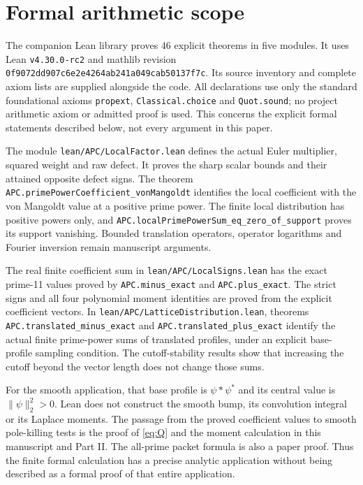 \documentclass[11pt,letterpaper]{article}
\theoremstyle{definition}
\theoremstyle{remark}
\begin{document}
\section{Formal arithmetic scope}

The companion Lean library \cite{APCcode} proves 46 explicit
theorems in five modules. It uses Lean \texttt{v4.30.0-rc2}
and mathlib revision
\nolinkurl{0f9072dd907c6e2e4264ab241a049cab50137f7c}.
Its source inventory and complete axiom lists are supplied
alongside the code. All declarations use only the standard
foundational axioms \texttt{propext}, \texttt{Classical.choice}
and \texttt{Quot.sound}; no project arithmetic axiom or admitted
proof is used. This concerns the explicit formal statements
described below, not every argument in this paper.

The module \nolinkurl{lean/APC/LocalFactor.lean} defines the
actual Euler multiplier, squared weight and raw defect.
It proves the sharp scalar bounds and their attained opposite
defect signs. The theorem
\nolinkurl{APC.primePowerCoefficient_vonMangoldt}
identifies the local coefficient with the von Mangoldt value
at a positive prime power. The finite local distribution has
positive powers only, and
\nolinkurl{APC.localPrimePowerSum_eq_zero_of_support}
proves its support vanishing. Bounded translation operators,
operator logarithms and Fourier inversion remain manuscript
arguments.

The real finite coefficient sum in
\nolinkurl{lean/APC/LocalSigns.lean} has the exact prime-11
values proved by \nolinkurl{APC.minus_exact} and
\nolinkurl{APC.plus_exact}. The strict signs and all four
polynomial moment identities are proved from the explicit
coefficient vectors. In
\nolinkurl{lean/APC/LatticeDistribution.lean}, theorems
\nolinkurl{APC.translated_minus_exact} and
\nolinkurl{APC.translated_plus_exact} identify the actual finite
prime-power sums of translated profiles, under an explicit
base-profile sampling condition. The cutoff-stability results
show that increasing the cutoff beyond the vector length does
not change those sums.

For the smooth application, that base profile is
$\psi*\psi^*$ and its central value is $\|\psi\|_2^2>0$.
Lean does not construct the smooth bump, its convolution
integral or its Laplace moments. The passage from the proved
coefficient values to smooth pole-killing tests is the proof
of \eqref{eq:Q} and the moment calculation in this manuscript
and Part II. The all-prime packet formula is also a paper
proof. Thus the finite formal calculation has a precise
analytic application without being described as a formal
proof of that entire application.
\end{document}
